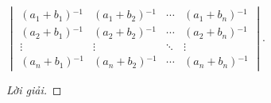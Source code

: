 \documentclass[class=linearalgebra,crop=false]{standalone}
\begin{document}
\begin{exercise}
    $\begin{vmatrix}
            (a_{1} + b_{1}){}^{-1} & (a_{1} + b_{2}){}^{-1} & \cdots & (a_{1} + b_{n}){}^{-1} \\
            (a_{2} + b_{1}){}^{-1} & (a_{2} + b_{2}){}^{-1} & \cdots & (a_{2} + b_{n}){}^{-1} \\
            \vdots                 & \vdots                 & \ddots & \vdots                 \\
            (a_{n} + b_{1}){}^{-1} & (a_{n} + b_{2}){}^{-1} & \cdots & (a_{n} + b_{n}){}^{-1}
        \end{vmatrix}$.
\end{exercise}

\begin{proof}[Lời giải]
\end{proof}
\end{document}
